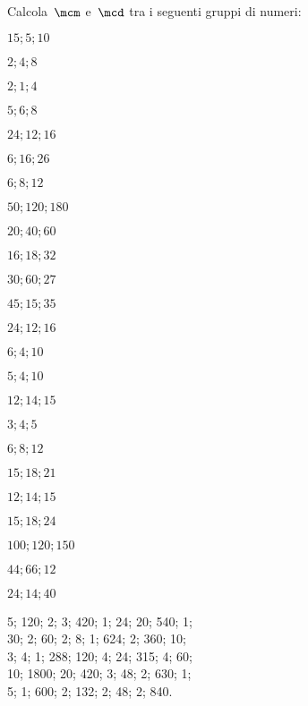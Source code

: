 \begin{esercizio}
Calcola~\(\mcm\) e~\(\mcd\) tra i seguenti gruppi di numeri:
\begin{htmulticols}{4}
 \begin{enumeratees}
 \item \(15; 5; 10\)
 \item \(2; 4; 8\)
 \item \(2; 1; 4\)
 \item \(5; 6; 8\)
 \item \(24; 12; 16\)
 \item \(6; 16; 26\)
 \item \(6; 8; 12\)
 \item \(50; 120; 180\)
 \item \(20; 40; 60\)
 \item \(16; 18; 32\)
 \item \(30; 60; 27\)
 \item \(45; 15; 35\)
 \item \(24; 12; 16\)
 \item \(6; 4; 10\)
 \item \(5; 4; 10\)
 \item \(12; 14; 15\)
 \item \(3; 4; 5\)
 \item \(6; 8; 12\)
 \item \(15; 18; 21\)
 \item \(12; 14; 15\)
 \item \(15; 18; 24\)
 \item \(100; 120; 150\)
 \item \(44; 66; 12\)
 \item \(24; 14; 40\)
 \end{enumeratees}
\end{htmulticols}
\noindent\! 5; 
 120;
 2; 
 3; 
 420;
 1; 
 24;
 20;
 540;
 1; \\
 30;
 2; 
 60;
 2; 
 8;
 1; 
 624;
 2; 
 360;
 10; \\
 3; 
 4;
 1; 
 288;
 120;
 4; 
 24;
 315;
 4; 
 60; \\
 10; 
 1800;
 20; 
 420;
 3; 
 48;
 2; 
 630;
 1; \\
 5; 
 1; 
 600;
 2; 
 132;
 2; 
 48;
 2; 
 840.

\end{esercizio}

